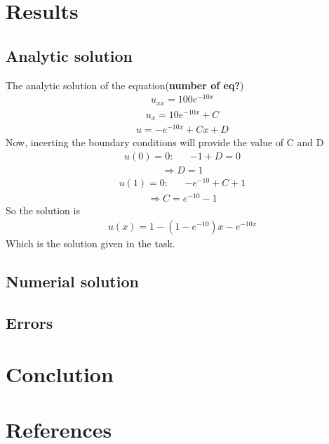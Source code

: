 \documentclass[norsk]{article}
\begin{document}
\section{Results}
\subsection{Analytic solution}
The analytic solution of the equation(\textbf{number of eq?})
\begin{align}
{u_{xx}=100e^{-10x}}
\end{align}
\begin{align}
{u_x=10e^{-10x}+C}
\end{align}
\begin{align}
{u=-e^{-10x}+Cx+D}
\end{align}
Now, incerting the boundary conditions will provide the value of C and D
\begin{align}
{u(0)=0:} & 
& {-1 + D=0}  
\end{align}
\begin{align}
{\Rightarrow D=1}
\end{align}
\begin{align}
{u(1)=0:} &
& {-e^{-10}+C+1}
\end{align}
\begin{align}
{\Rightarrow C=e^{-10}-1}
\end{align}
So the solution is
\begin{align}
{u(x)=1-(1-e^{-10})x-e^{-10x}}
\end{align}
Which is the solution given in the task.
\subsection{Numerial solution}
\subsection{Errors}
\section{Conclution}

\section{References}
\end{document}
